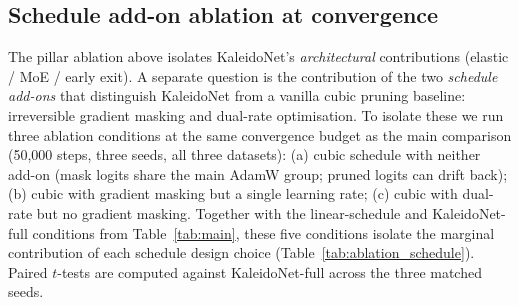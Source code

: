 \documentclass[fleqn,10pt]{article}
\begin{document}
\subsection*{Schedule add-on ablation at convergence}

The pillar ablation above isolates KaleidoNet's \emph{architectural}
contributions (elastic / MoE / early exit). A separate question is
the contribution of the two \emph{schedule add-ons}
that distinguish KaleidoNet from a vanilla cubic pruning baseline:
irreversible gradient masking and dual-rate optimisation. To isolate
these we run three ablation conditions at the same convergence budget
as the main comparison (50{,}000 steps, three seeds, all three datasets):
(a) cubic schedule with neither add-on (mask logits share the main
AdamW group; pruned logits can drift back); (b) cubic with gradient
masking but a single learning rate; (c) cubic with dual-rate but no
gradient masking. Together with the linear-schedule and KaleidoNet-full
conditions from Table~\ref{tab:main}, these five conditions isolate the
marginal contribution of each schedule design choice
(Table~\ref{tab:ablation_schedule}). Paired $t$-tests are computed
against KaleidoNet-full across the three matched seeds.


\end{document}
